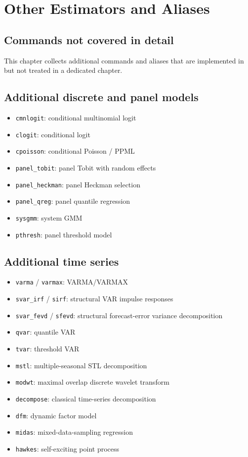 \chapter{Other Estimators and Aliases}

\section{Commands not covered in detail}

This chapter collects additional commands and aliases that are
implemented in \hayashi{} but not treated in a dedicated chapter.

\section{Additional discrete and panel models}

\begin{itemize}
\item \texttt{cmnlogit}: conditional multinomial logit
\item \texttt{clogit}: conditional logit
\item \texttt{cpoisson}: conditional Poisson / PPML
\item \texttt{panel\_tobit}: panel Tobit with random effects
\item \texttt{panel\_heckman}: panel Heckman selection
\item \texttt{panel\_qreg}: panel quantile regression
\item \texttt{sysgmm}: system GMM
\item \texttt{pthresh}: panel threshold model
\end{itemize}

\section{Additional time series}

\begin{itemize}
\item \texttt{varma} / \texttt{varmax}: VARMA/VARMAX
\item \texttt{svar\_irf} / \texttt{sirf}: structural VAR impulse responses
\item \texttt{svar\_fevd} / \texttt{sfevd}: structural forecast-error variance
      decomposition
\item \texttt{qvar}: quantile VAR
\item \texttt{tvar}: threshold VAR
\item \texttt{mstl}: multiple-seasonal STL decomposition
\item \texttt{modwt}: maximal overlap discrete wavelet transform
\item \texttt{decompose}: classical time-series decomposition
\item \texttt{dfm}: dynamic factor model
\item \texttt{midas}: mixed-data-sampling regression
\item \texttt{hawkes}: self-exciting point process
\end{itemize}

